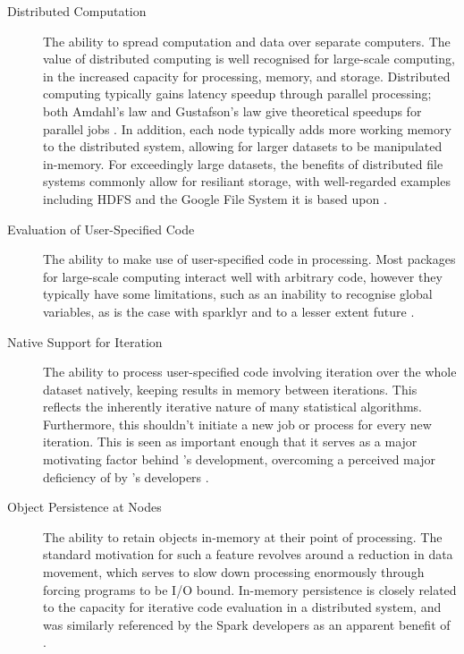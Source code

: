 \begin{description}
  \item[Distributed Computation]
    The ability to spread computation and data over separate computers. The
    value of distributed computing is well recognised for large-scale
    computing, in the increased capacity for processing, memory, and
    storage. Distributed computing typically gains latency speedup through
    parallel processing; both Amdahl's law and Gustafson's law give
    theoretical speedups for parallel jobs \cites{amdahl1967law,gustafson1988law}. In addition, each node typically adds more working
    memory to the distributed system, allowing for larger datasets to be
    manipulated in-memory. For exceedingly large datasets, the benefits of
    distributed file systems commonly allow for resiliant storage, with
    well-regarded examples including HDFS and the Google File System it is
    based upon \cites{shvachko2010hadoop,ghemawat2003google}.
  \item[Evaluation of User-Specified Code]
    The ability to make use of user-specified code in processing. Most \R
    packages for large-scale computing interact well with arbitrary code,
    however they typically have some limitations, such as an inability to
    recognise global variables, as is the case with sparklyr and to a lesser
    extent future \cites{sparklyr2020limitations,microsoft20}.
  \item[Native Support for Iteration]
    The ability to process user-specified code involving iteration over the
    whole dataset natively, keeping results in memory between iterations.
    This reflects the inherently iterative nature of many statistical
    algorithms. Furthermore, this shouldn't initiate a new job or process
    for every new iteration. This is seen as important enough that it serves
    as a major motivating factor behind 's development, overcoming a
    perceived major deficiency of  by 's developers
    \cite{zaharia2010spark}.
  \item[Object Persistence at Nodes]
    The ability to retain objects in-memory at their point of processing.
    The standard motivation for such a feature revolves around a reduction
    in data movement, which serves to slow down processing enormously
    through forcing programs to be I/O bound. In-memory persistence is
    closely related to the capacity for iterative code evaluation in a
    distributed system, and was similarly referenced by the Spark developers
    as an apparent benefit of \cite{zaharia2010spark}.

\end{description}
